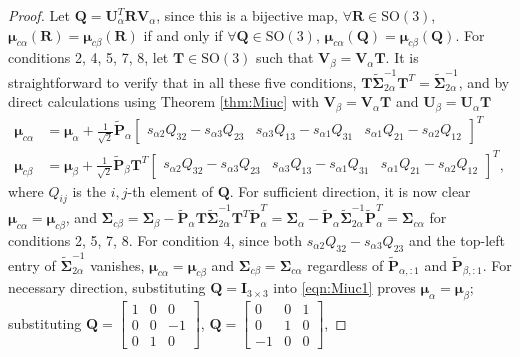 \documentclass[12pt]{article}
\begin{document}
\begin{proof}
	Let $\mathbf{Q} = \mathbf{U}_{\alpha}^T\mathbf{R}\mathbf{V}_{\alpha}$, since this is a bijective map, $\forall\mathbf{R}\in\mathrm{SO}(3)$, $\bm{\mu}_{c\alpha}(\mathbf{R})=\bm{\mu}_{c\beta}(\mathbf{R})$ if and only if $\forall\mathbf{Q}\in\mathrm{SO}(3)$, $\bm{\mu}_{c\alpha}(\mathbf{Q})=\bm{\mu}_{c\beta}(\mathbf{Q})$.
	For conditions 2, 4, 5, 7, 8, let $\mathbf{T}\in\mathrm{SO}(3)$ such that $\mathbf{V}_\beta=\mathbf{V}_\alpha\mathbf{T}$.
	It is straightforward to verify that in all these five conditions, $\mathbf{T}\tilde{\mathbf{\Sigma}}_{2\alpha}^{-1}\mathbf{T}^T=\tilde{\mathbf{\Sigma}}_{2\alpha}^{-1}$, and by direct calculations using Theorem \ref{thm:Miuc} with $\mathbf{V}_\beta=\mathbf{V}_\alpha\mathbf{T}$ and $\mathbf{U}_\beta=\mathbf{U}_\alpha\mathbf{T}$
	\begin{align}
		\label{eqn:Miuc1}
		\bm{\mu}_{c\alpha} &= \bm{\mu}_\alpha + \frac{1}{\sqrt{2}}\tilde{\mathbf{P}}_\alpha\begin{bmatrix}
			s_{\alpha 2}Q_{32}-s_{\alpha 3}Q_{23} & s_{\alpha 3}Q_{13}-s_{\alpha 1}Q_{31} & s_{\alpha 1}Q_{21}-s_{\alpha 2}Q_{12}
		\end{bmatrix}^T \nonumber \\
		\bm{\mu}_{c\beta} &= \bm{\mu}_\beta + \frac{1}{\sqrt{2}}\tilde{\mathbf{P}}_\beta\mathbf{T}^T\begin{bmatrix}
			s_{\alpha 2}Q_{32}-s_{\alpha 3}Q_{23} & s_{\alpha 3}Q_{13}-s_{\alpha 1}Q_{31} & s_{\alpha 1}Q_{21}-s_{\alpha 2}Q_{12}
		\end{bmatrix}^T,
	\end{align}
	where $Q_{ij}$ is the $i,j$-th element of $\mathbf{Q}$.
	For sufficient direction, it is now clear $\bm{\mu}_{c\alpha}=\bm{\mu}_{c\beta}$, and $\mathbf{\Sigma}_{c\beta} = \mathbf{\Sigma}_\beta-\tilde{\mathbf{P}}_\alpha\mathbf{T}\tilde{\mathbf{\Sigma}}_{2\alpha}^{-1}\mathbf{T}^T\tilde{\mathbf{P}}_\alpha^T = \mathbf{\Sigma}_\alpha-\tilde{\mathbf{P}}_\alpha\tilde{\mathbf{\Sigma}}_{2\alpha}^{-1}\tilde{\mathbf{P}}_\alpha^T = \mathbf{\Sigma}_{c\alpha}$ for conditions 2, 5, 7, 8.
	For condition 4, since both $s_{\alpha 2}Q_{32}-s_{\alpha 3}Q_{23}$ and the top-left entry of $\tilde{\mathbf{\Sigma}}_{2\alpha}^{-1}$ vanishes, $\bm{\mu}_{c\alpha}=\bm{\mu}_{c\beta}$ and $\mathbf{\Sigma}_{c\beta}=\mathbf{\Sigma}_{c\alpha}$ regardless of $\tilde{\mathbf{P}}_{\alpha,:1}$ and $\tilde{\mathbf{P}}_{\beta,:1}$.
	For necessary direction, substituting $\mathbf{Q}=\mathbf{I}_{3\times 3}$ into \eqref{eqn:Miuc1} proves $\bm{\mu}_\alpha=\bm{\mu}_\beta$;  substituting $\mathbf{Q}=\begin{bmatrix}1&0&0\\0&0&-1\\0&1&0\end{bmatrix}$, $\mathbf{Q}=\begin{bmatrix}0&0&1\\0&1&0\\-1&0&0\end{bmatrix}$,

\end{proof}
\end{document}
